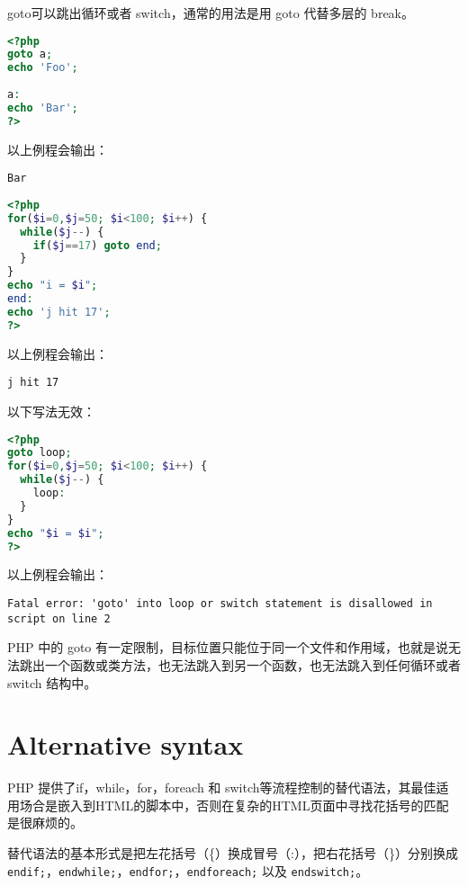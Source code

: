 goto可以跳出循环或者 switch，通常的用法是用 goto 代替多层的 break。



\begin{lstlisting}[language=PHP]
<?php
goto a;
echo 'Foo';
 
a:
echo 'Bar';
?>
\end{lstlisting}

以上例程会输出：

\begin{verbatim}
Bar
\end{verbatim}

\begin{lstlisting}[language=PHP]
<?php
for($i=0,$j=50; $i<100; $i++) {
  while($j--) {
    if($j==17) goto end; 
  }  
}
echo "i = $i";
end:
echo 'j hit 17';
?>
\end{lstlisting}

以上例程会输出：

\begin{verbatim}
j hit 17
\end{verbatim}

以下写法无效：

\begin{lstlisting}[language=PHP]
<?php
goto loop;
for($i=0,$j=50; $i<100; $i++) {
  while($j--) {
    loop:
  }
}
echo "$i = $i";
?>
\end{lstlisting}

以上例程会输出：

\begin{verbatim}
Fatal error: 'goto' into loop or switch statement is disallowed in
script on line 2
\end{verbatim}

PHP 中的 goto 有一定限制，目标位置只能位于同一个文件和作用域，也就是说无法跳出一个函数或类方法，也无法跳入到另一个函数，也无法跳入到任何循环或者 switch 结构中。


\section{Alternative syntax}


PHP 提供了if，while，for，foreach 和 switch等流程控制的替代语法，其最佳适用场合是嵌入到HTML的脚本中，否则在复杂的HTML页面中寻找花括号的匹配是很麻烦的。

替代语法的基本形式是把左花括号（\{）换成冒号（:），把右花括号（\}）分别换成\texttt{endif;}，\texttt{endwhile;}，\texttt{endfor;}，\texttt{endforeach;} 以及 \texttt{endswitch;}。

